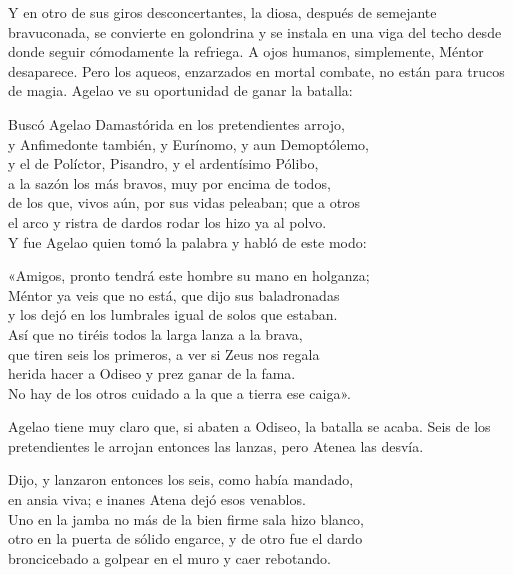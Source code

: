 Y en otro de sus giros desconcertantes, la diosa, después de semejante bravuconada, se convierte en golondrina y se instala en una viga del techo desde donde seguir cómodamente la refriega. A ojos humanos, simplemente, Méntor desaparece. Pero los aqueos, enzarzados en mortal combate, no están para trucos de magia. Agelao ve su oportunidad de ganar la batalla:

\begin{versocita}
Buscó Agelao Damastórida en los pretendientes arrojo,\\
y Anfimedonte también, y Eurínomo, y aun Demoptólemo,\\
y el de Políctor, Pisandro, y el ardentísimo Pólibo,\\
a la sazón los más bravos, muy por encima de todos,\\
de los que, vivos aún, por sus vidas peleaban; que a otros\\
el arco y ristra de dardos rodar los hizo ya al polvo.\\
Y fue Agelao quien tomó la palabra y habló de este modo:
\end{versocita}

\begin{versocita}
«Amigos, pronto tendrá este hombre su mano en holganza;\\
Méntor ya veis que no está, que dijo sus baladronadas\\
y los dejó en los lumbrales igual de solos que estaban.\\
Así que no tiréis todos la larga lanza a la brava,\\
que tiren seis los primeros, a ver si Zeus nos regala\\
herida hacer a Odiseo y prez ganar de la fama.\\
No hay de los otros cuidado a la que a tierra ese caiga».
\end{versocita}

Agelao tiene muy claro que, si abaten a Odiseo, la batalla se acaba. Seis de los pretendientes le arrojan entonces las lanzas, pero Atenea las desvía.

\begin{versocita}
Dijo, y lanzaron entonces los seis, como había mandado,\\
en ansia viva; e inanes Atena dejó esos venablos.\\
Uno en la jamba no más de la bien firme sala hizo blanco,\\
otro en la puerta de sólido engarce, y de otro fue el dardo\\
broncicebado a golpear en el muro y caer rebotando.
\end{versocita}

